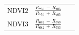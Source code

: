 \documentclass[remotesensing,article,accept,moreauthors,pdftex]{Definitions/mdpi}
\begin{document}
\begin{paracol}{2}
\begin{specialtable}[H]
{\begin{tabular}{lll}
		NDVI2           & $\frac{R_{750}\,-\,R_{705}}{R_{750}\,+\,R_{705}}$                                                            &~\cite{gitelson1994}           \\
		NDVI3           & $\frac{R_{682}\,-\,R_{553}}{R_{682}\,+\,R_{553}}$                                                            &~\cite{guanter2005}            \\

\end{tabular}}
\end{specialtable}
\end{paracol}
\end{document}
